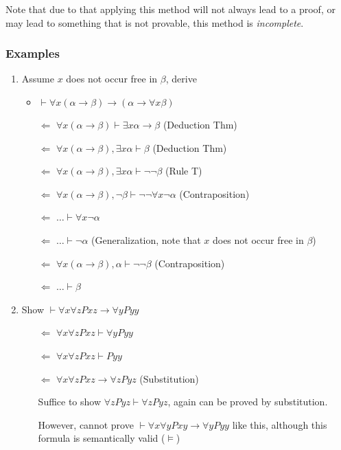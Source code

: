 Note that due to that applying this method will not always lead to a proof, or may lead to something that is not provable, this method is \emph{incomplete}.

\subsubsection{Examples}

\begin{enumerate}
    \item Assume $x$ does not occur free in $\beta$, derive

    \begin{itemize}
        \item $\vdash\forall x \left( \alpha \to \beta \right) \rightarrow \left( \alpha\to\forall x \beta \right)$
        \item[$\Leftarrow$] $\forall x \left( \alpha\to\beta \right)\vdash\exists x\alpha\to\beta$ (Deduction Thm)
        \item[$\Leftarrow$] $\forall x \left( \alpha\to\beta \right), \exists x \alpha \vdash \beta$ (Deduction Thm)
        \item[$\Leftarrow$] $\forall x \left( \alpha\to\beta \right), \exists x \alpha \vdash \neg\neg\beta$ (Rule T)
        \item[$\Leftarrow$] $\forall x \left( \alpha\to\beta \right),\neg\beta \vdash \neg\neg\forall x\neg \alpha$ (Contraposition)
        \item[$\Leftarrow$] $\dots \vdash \forall x\neg \alpha$
        \item[$\Leftarrow$] $\dots\vdash\neg\alpha$ (Generalization, note that $x$ does not occur free in $\beta$)
        \item[$\Leftarrow$] $\forall x \left( \alpha\to\beta \right),\alpha\vdash\neg\neg\beta$ (Contraposition)
        \item[$\Leftarrow$] $\dots\vdash\beta$   
    \end{itemize}

    \item Show $\vdash\forall x \forall z Pxz \to \forall{y} Pyy$
    \begin{itemize}
        \item[$\Leftarrow$] $\forall x \forall z Pxz \vdash \forall y Pyy$
        \item[$\Leftarrow$] $\forall x \forall z Pxz \vdash Pyy$
        \item[$\Leftarrow$] $\forall x \forall z Pxz \to \forall z Pyz$ (Substitution)
        \item[] Suffice to show $\forall zPyz \vdash \forall z Pyz$, again can be proved by substitution.  
        \item[] However, cannot prove $\vdash\forall x\forall y Pxy \to \forall y Pyy$ like this, although this formula is semantically valid ($\vDash$)
    \end{itemize}


\end{enumerate}
